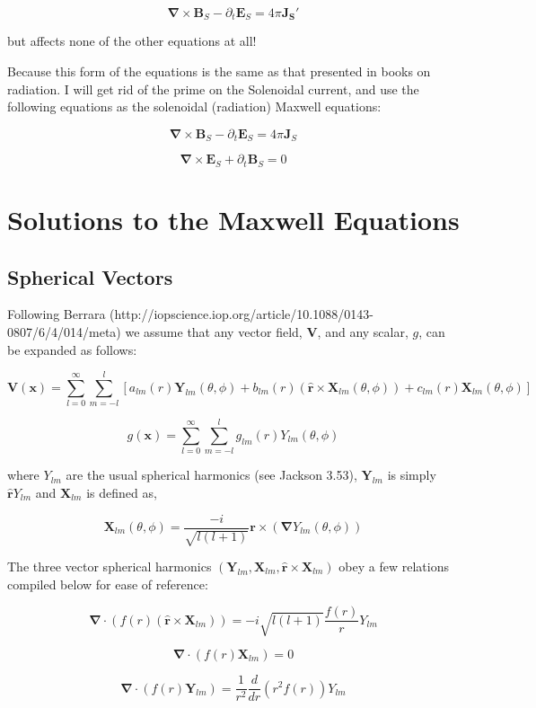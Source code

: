 \documentclass {article}
\renewcommand\vec{\mathbf}
\let\OldS\nabla
\renewcommand{\nabla}{\boldsymbol{\OldS}}
\let\OldHat\hat
\renewcommand{\hat}[1]{\OldHat{\mathbf{#1}}}
\begin{document}
$$\nabla \times \vec B_S - \partial_t \vec E_S =  4 \pi \vec {J_S'} $$

but affects none of the other equations at all!

Because this form of the equations is the same as that presented in books on radiation. I will get rid of the prime on the Solenoidal current, and use the following equations as the solenoidal (radiation) Maxwell equations:

$$\nabla \times \vec B_S - \partial_t \vec E_S =  4 \pi \vec J_S$$

$$\nabla \times \vec E_S + \partial_t \vec B_S = 0 $$
\newpage

\section{Solutions to the Maxwell Equations}
\subsection{Spherical Vectors}
Following Berrara (http://iopscience.iop.org/article/10.1088/0143-0807/6/4/014/meta) we assume that any vector field, $\vec V$, and any scalar, $g$, can be expanded as follows:

$$\vec V (\vec x) = \sum_{l=0}^{\infty} \sum_{m=-l}^{l} \left[a_{lm}(r) \vec Y_{lm}(\theta, \phi) +b_{lm}(r) \left( \hat r \times \vec X_{lm} (\theta, \phi) \right) +c_{lm}(r) \vec X_{lm} (\theta, \phi) \right] $$

$$g(\vec x) = \sum_{l=0}^{\infty} \sum_{m=-l}^{l} g_{lm}(r) Y_{lm}(\theta, \phi)$$

where $Y_{lm}$ are the usual spherical harmonics (see Jackson 3.53), $\vec Y_{lm}$ is simply $\hat r Y_{lm}$  and $\vec X_{lm}$ is defined as,

$$\vec X_{lm}(\theta, \phi) = \frac {-i}{\sqrt{l(l+1)}} \vec r \times \left( \nabla Y_{lm}(\theta, \phi) \right) $$

The three vector spherical harmonics $(\vec Y_{lm}, \vec X_{lm}, \hat r \times \vec X_{lm} )$ obey a few relations compiled below for ease of reference:

$$\nabla  \cdot \left( f(r) \left( \hat r \times \vec X_{lm} \right) \right) = - i \sqrt {l(l+1)} \frac {f(r)} {r} Y_{lm}$$

$$\nabla \cdot \left( f(r) \vec X_{lm} \right) = 0 $$

$$ \nabla \cdot \left( f(r) \vec Y_{lm} \right) = \frac {1}{r^2} \frac d {dr} \left(r^2 f(r) \right) Y_{lm}$$
\end{document}
